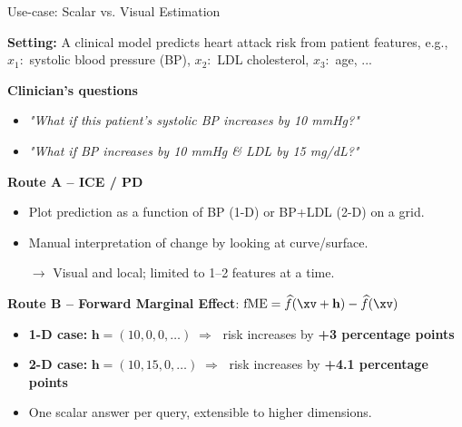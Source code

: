 \documentclass[10pt,compress,t,notes=noshow, xcolor=table]{beamer}
\begin{document}
\begin{frame}{Use-case: Scalar vs. Visual Estimation}

\textbf{Setting:}  
A clinical model predicts heart attack risk from patient features, e.g., $x_1:$ systolic blood pressure (BP), $x_2:$ LDL cholesterol, $x_3:$ age, ...

\vspace{0.5em}
\textbf{Clinician’s questions}
\begin{itemize}\setlength\itemsep{0.3em}
  \item \emph{"What if this patient’s systolic BP increases by 10 mmHg?"}
  \item \emph{"What if BP increases by 10 mmHg \& LDL by 15 mg/dL?"}
\end{itemize}

\vspace{0.5em}
\textbf{Route A – ICE / PD}
\begin{itemize}
  \item Plot prediction as a function of BP (1-D) or BP+LDL (2-D) on a grid.
  \item Manual interpretation of change by looking at curve/surface.
  \item[\(\rightarrow\)] Visual and local; limited to 1–2 features at a time.
\end{itemize}

\vspace{0.3em}
\textbf{Route B – Forward Marginal Effect}: $\mathrm{fME}
  = \widehat f(\xv + \mathbf{h}) - \widehat f(\xv)$
\begin{itemize}
  \item \textbf{1-D case:} \(\mathbf{h} = (10, 0, 0, \dots) \;\Rightarrow\;\) risk increases by \textbf{+3 percentage points}
  \item \textbf{2-D case:} \(\mathbf{h} = (10, 15, 0, \dots) \;\Rightarrow\;\) risk increases by \textbf{+4.1 percentage points}
  \item One scalar answer per query, extensible to higher dimensions.
\end{itemize}

\end{frame}

\end{document}
